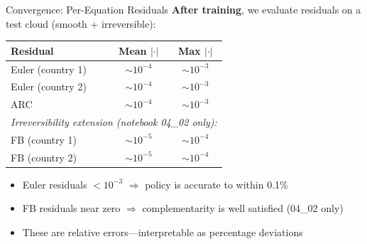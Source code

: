 \documentclass[aspectratio=169,11pt]{beamer}
\newcommand{\emphc}[1]{\textcolor{harvardcrimson}{#1}}
\begin{document}
\begin{frame}{Convergence: Per-Equation Residuals}
\textbf{After training}, we evaluate residuals on a test cloud (smooth + irreversible):

\vspace{0.5em}
\begin{center}
\begin{tabular}{lcc}
\toprule
\textbf{Residual} & \textbf{Mean $|\cdot|$} & \textbf{Max $|\cdot|$} \\
\midrule
Euler (country 1) & $\sim 10^{-4}$ & $\sim 10^{-3}$ \\
Euler (country 2) & $\sim 10^{-4}$ & $\sim 10^{-3}$ \\
ARC & $\sim 10^{-4}$ & $\sim 10^{-3}$ \\
\midrule
\multicolumn{3}{l}{\textit{Irreversibility extension (notebook 04\_02 only):}} \\
FB (country 1) & $\sim 10^{-5}$ & $\sim 10^{-4}$ \\
FB (country 2) & $\sim 10^{-5}$ & $\sim 10^{-4}$ \\
\bottomrule
\end{tabular}
\end{center}

\vspace{0.3em}
\begin{itemize}
    \item Euler residuals $< 10^{-3}$ $\Rightarrow$ policy is accurate to within 0.1\%
    \item FB residuals near zero $\Rightarrow$ complementarity is well satisfied (04\_02 only)
    \item These are \emphc{relative errors}---interpretable as percentage deviations
\end{itemize}
\end{frame}
\end{document}
